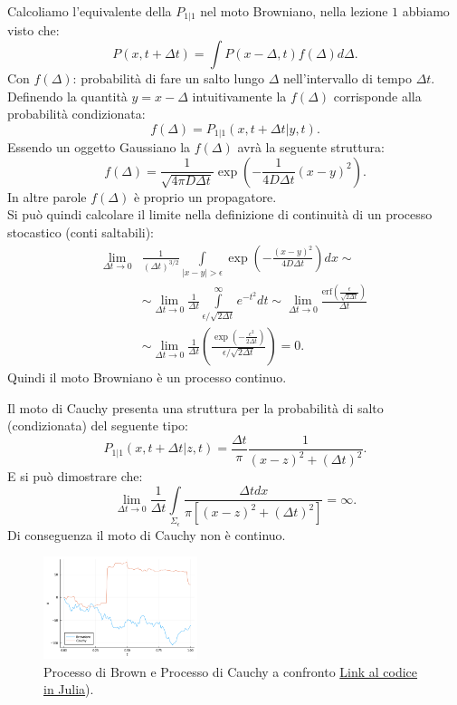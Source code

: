 \begin{exmp}
    Calcoliamo l'equivalente della $P_{1|1}$ nel moto Browniano, nella lezione $1$ abbiamo visto che:
    \[
	P(x, t+\Delta t) = \int P(x-\Delta, t) f(\Delta) d\Delta
    .\] 
    Con $f(\Delta)$: probabilità di fare un salto lungo $\Delta$ nell'intervallo di tempo $\Delta t$.\\
    Definendo la quantità $y = x-\Delta$ intuitivamente la $f(\Delta)$ corrisponde alla probabilità condizionata:
    \[
	f(\Delta) = P_{1|1}(x, t+\Delta t| y, t) 
    .\] 
    Essendo un oggetto Gaussiano la $f(\Delta)$ avrà la seguente struttura:
    \[
	f(\Delta) = \frac{1}{\sqrt{4\pi D\Delta t} }\exp\left(-\frac{1}{4D\Delta t} \left(x-y\right)^2  \right) 
    .\] 
    In altre parole $f(\Delta)$ è proprio un propagatore.\\
    Si può quindi calcolare il limite nella definizione di continuità di un processo stocastico (conti saltabili):
    \[\begin{aligned}
	\lim_{\Delta t \to 0} &\frac{1}{\left(\Delta t\right)^{3 /2}}\int\limits_{\left|x-y\right|>\epsilon } 
	\exp\left(-\frac{\left(x-y\right)^2}{4D\Delta t }\right) dx \sim \\ 
			      &\sim \lim_{\Delta t \to 0} \frac{1}{\Delta t}\int\limits_{\epsilon /\sqrt{2\Delta t}}^\infty e^{-t^2} dt 
			       \sim \lim_{\Delta t \to 0} \frac{\mbox{erf}\left(\frac{\epsilon}{\sqrt{2\Delta t}}\right)}{\Delta t} \\
			      & \sim 
                               \lim_{\Delta t \to 0} \frac{1}{\Delta t}
			       \left(\frac{\exp\left(-\frac{\epsilon^2}{2\Delta t}\right)}{\epsilon /\sqrt{2\Delta t}}\right) = 0
    .\end{aligned}\]
    Quindi il moto Browniano è un processo continuo.
\end{exmp}
\noindent
\begin{exmp}
    Il moto di Cauchy presenta una struttura per la probabilità di salto (condizionata) del seguente tipo:
    \[
	P_{1|1}(x,t+\Delta t| z , t)  = \frac{\Delta t}{\pi} \frac{1}{\left(x-z\right)^2 + \left(\Delta t\right)^2}
    .\] 
    E si può dimostrare che:
    \[
	\lim_{\Delta t \to 0} \frac{1}{\Delta t}\int\limits_{\Sigma_\epsilon}
	\frac{\Delta t dx}{\pi\left[\left(x-z\right)^2 + \left(\Delta t\right)^2\right]} = \infty
    .\] 
    Di conseguenza il moto di Cauchy non è continuo.
\end{exmp}
\noindent
\begin{figure}[H]
    \centering
    \includegraphics[width=0.4\textwidth]{figures/4_cauchy-brown.png}
    \caption{\scriptsize Processo di Brown e Processo di Cauchy a confronto \href{https://github.com/dodogabrie/Sistemi-Complessi/blob/master/python-project/lezione4/lez4_Cauchy-Brown.ipynb}{Link al codice in Julia}).}
    \label{fig:-fig}
\end{figure}

